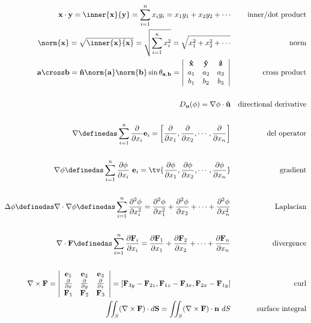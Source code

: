 \begin{align*}
\mathbf x \cdot \mathbf y
= \inner{\mathbf x}{\mathbf y}
= \sum_{i=1}^n {x_i y_i} = x_1y_1 + x_2y_2 + \cdots
&& \text{inner/dot product}
\\
\norm{\mathbf x} = \sqrt{\inner{\mathbf x}{\mathbf x}}
= \sqrt{\sum_{i=1}^n x_i^2}
= \sqrt{x_1^2 + x_2^2 + \cdots}
&& \text{norm}
\\
\mathbf a \cross \mathbf b
= \mathbf{\hat n} \norm{\mathbf a}\norm{\mathbf b}\sin\theta_{\mathbf a,\mathbf b}
= \left| \begin{array}{ccc}
\mathbf{\hat x} & \mathbf{\hat y} & \mathbf{\hat z} \\
a_1 & a_2 & a_3 \\
b_1 & b_2 & b_3
\end{array}\right|
&& \text{cross product} \\ \\
D_\mathbf{u}(\phi) = \nabla \phi \cdot \mathbf{\hat u}
&& \text{directional derivative} \\ \\
\nabla
\definedas \sum_{i=1}^n \frac{\partial}{\partial x_i} \mathbf{e}_i
= \left[\frac{\partial}{\partial x_1}, \frac{\partial}{\partial x_2}, \cdots, \frac{\partial}{\partial x_n}\right]
&& \text{del operator}
\\ \\
\nabla \phi
\definedas \sum_{i=1}^n \frac{\partial \phi}{\partial x_i} ~\mathbf{e}_i
= \tv{ \frac{\partial \phi}{\partial x_1}, \frac{\partial \phi}{\partial x_2}, \cdots, \frac{\partial \phi}{\partial x_n}}
&& \text{gradient} \\ \\
\Delta \phi \definedas \nabla\cdot\nabla \phi \definedas \sum_{i=1}^n \frac{\partial^2 \phi}{\partial x_i^2}
= \frac{\partial^2 \phi}{\partial x_1^2} + \frac{\partial^2 \phi}{\partial x_2} + \cdots + \frac{\partial^2 \phi}{\partial x_n^2}
&& \text{Laplacian}
\\ \\
\nabla \cdot \mathbf{F}
\definedas \sum_{i=1}^n \frac{\partial \mathbf{F}_i}{\partial x_i} = \frac{\partial \mathbf{F}_1}{\partial x_1} + \frac{\partial \mathbf{F}_2}{\partial x_2} + \cdots + \frac{\partial \mathbf{F}_n}{\partial x_n}
&& \text{divergence} \\ \\
\nabla \times \mathbf { F }
= \left| \begin{array} { c c c } { \mathbf { e }_1 } & { \mathbf { e }_2 } & { \mathbf { e }_3 } \\ { \frac { \partial } { \partial x } } & { \frac { \partial } { \partial y } } & { \frac { \partial } { \partial z } } \\ { \mathbf{F} _ { 1 } } & { \mathbf{F} _ { 2 } } & { \mathbf{F} _ { 3 } } \end{array} \right|  = [\mathbf{F}_{3y} - \mathbf{F}_{2z}, \mathbf{F}_{1z}- \mathbf{F}_{3x}, \mathbf{F}_{2x} -\mathbf{F}_{1y}]
&& \text{curl}
\\
\iint _ { S } ( \nabla \times \mathbf { F } ) \cdot d \mathbf { S } = \iint _ { S } ( \nabla \times \mathbf { F } ) \cdot \mathbf { n } ~dS
&& \text{surface integral}
\end{align*}

